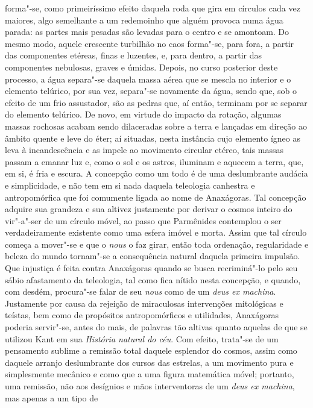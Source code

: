 forma"-se, como primeiríssimo efeito daquela roda que gira em círculos
cada vez maiores, algo semelhante a um redemoinho que alguém provoca
numa água parada: as partes mais pesadas são levadas para o centro e se
amontoam. Do mesmo modo, aquele crescente turbilhão no caos forma"-se,
para fora, a partir das componentes etéreas, finas e luzentes, e, para
dentro, a partir das componentes nebulosas, graves e úmidas. Depois, no
curso posterior deste processo, a água separa"-se daquela massa aérea
que se mescla no interior e o elemento telúrico, por sua vez, separa"-se
novamente da água, sendo que, sob o efeito de um frio assustador, são
as pedras que, aí então, terminam por se separar do elemento telúrico.
De novo, em virtude do impacto da rotação, algumas massas rochosas
acabam sendo dilaceradas sobre a terra e lançadas em direção ao âmbito
quente e leve do éter; aí situadas, nesta instância cujo elemento ígneo
as leva à incandescência e as impele ao movimento circular etéreo, tais
massas passam a emanar luz e, como o sol e os astros, iluminam e
aquecem a terra, que, em si, é fria e escura. A concepção como um todo é de
uma deslumbrante audácia e simplicidade, e não tem em si nada daquela
teleologia canhestra e antropomórfica que foi comumente ligada ao nome
de Anaxágoras. Tal concepção adquire sua grandeza e sua altivez
justamente por derivar o cosmos inteiro do vir"-a"-ser de um círculo
móvel, ao passo que Parmênides contemplou o ser verdadeiramente
existente como uma esfera imóvel e morta. Assim que tal círculo começa
a mover"-se e que o \textit{nous} o faz girar, então toda ordenação,
regularidade e beleza do mundo tornam"-se a consequência natural daquela
primeira impulsão. Que injustiça é feita contra Anaxágoras quando se
busca recriminá"-lo pelo seu sábio afastamento da teleologia, tal como
fica nítido nesta concepção, e quando, com desdém, procura"-se falar de
seu \textit{nous} como de um \textit{deus ex machina}. Justamente por \label{exmachina}
causa da rejeição de miraculosas intervenções mitológicas e teístas,
bem como de propósitos antropomórficos e utilidades, Anaxágoras poderia
servir"-se, antes do mais, de palavras tão altivas quanto aquelas de que
se utilizou Kant em sua \textit{História natural do céu}. Com efeito,
trata"-se de um pensamento sublime a remissão total daquele esplendor do
cosmos, assim como daquele arranjo deslumbrante dos cursos das
estrelas, a um movimento pura e simplesmente mecânico e como que a uma
figura matemática móvel; portanto, uma remissão, não aos desígnios e
mãos interventoras de um \textit{deus ex machina}, mas apenas a um tipo de
